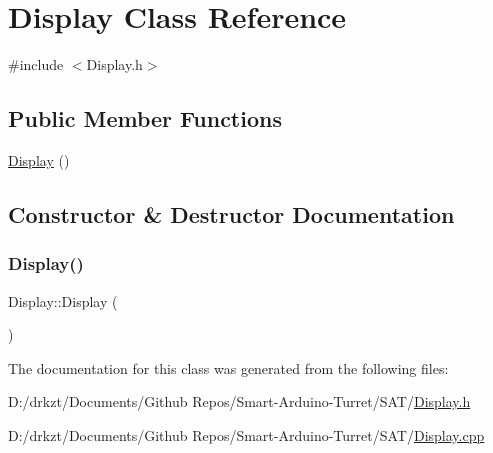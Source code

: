 \hypertarget{class_display}{}\section{Display Class Reference}
\label{class_display}


{\ttfamily \#include $<$Display.\+h$>$}

\subsection*{Public Member Functions}
\begin{DoxyCompactItemize}
\item 
\hyperlink{class_display_ae972fffea6f7ca1d627ef48c3d841bb3}{Display} ()
\end{DoxyCompactItemize}


\subsection{Constructor \& Destructor Documentation}
\mbox{\label{class_display_ae972fffea6f7ca1d627ef48c3d841bb3}} 
\subsubsection{\texorpdfstring{Display()}{Display()}}
{\footnotesize\ttfamily Display\+::\+Display (\begin{DoxyParamCaption}{ }\end{DoxyParamCaption})}



The documentation for this class was generated from the following files\+:\begin{DoxyCompactItemize}
\item 
D\+:/drkzt/\+Documents/\+Github Repos/\+Smart-\/\+Arduino-\/\+Turret/\+S\+A\+T/\hyperlink{_display_8h}{Display.\+h}\item 
D\+:/drkzt/\+Documents/\+Github Repos/\+Smart-\/\+Arduino-\/\+Turret/\+S\+A\+T/\hyperlink{_display_8cpp}{Display.\+cpp}\end{DoxyCompactItemize}

